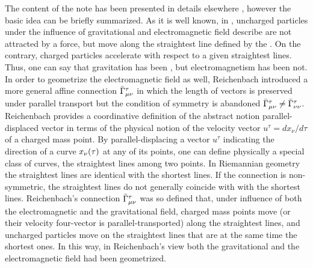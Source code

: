 \documentclass[draft]{article}
\newcommand{\ap}{\ensuremath{\tau}\xspace}
\newcommand{\dap}{\ensuremath{d\ap}\xspace}
\newcommand{\Gtmnbar}{\ensuremath{\bar{\Gamma}\tmn}\xspace}
\begin{document}
The content of the note has been presented in details elsewhere \citep{Giovanelli2016}, however the basic idea can be briefly summarized. As it is well known, in \gr, uncharged particles under the influence of gravitational and electromagnetic field describe are not attracted by a force, but move along the straightest line defined by the \Gtmn. On the contrary, charged particles accelerate with respect to a given straightest lines. Thus, one can say that gravitation has been , but electromagnetism has been not. In order to geometrize the electromagnetic field as well, Reichenbach introduced a more general affine connection \Gtmnbar in which the length of vectors is preserved under parallel transport but the condition of symmetry is abandoned $\Gtmnbar \neq \bar{\Gamma}^\tau_{\nu\nu}$. Reichenbach provides a coordinative definition of the abstract notion parallel-displaced vector in terms of the physical notion of the velocity vector $u^\tau=dx_\nu/\dap$ of a charged mass point. By parallel-displacing a vector $u^\tau$ indicating the direction of a curve $\xn(\ap)$ at any of its points, one can define physically a special class of curves, the straightest lines among two points. In Riemannian geometry the straightest lines are identical with the shortest lines. If the connection is non-symmetric, the straightest lines do not generally coincide with with the shortest lines. Reichenbach's connection \Gtmnbar was so defined that, under influence of both the electromagnetic and the gravitational field, charged mass points move (or their velocity four-vector is parallel-transported) along the straightest lines, and uncharged particles move on the straightest lines that are at the same time the shortest ones. In this way, in Reichenbach's view both the gravitational and the electromagnetic field had been geometrized.

\end{document}
